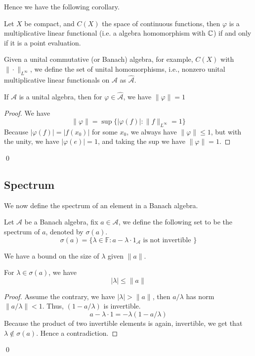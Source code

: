 Hence we have the following corollary.
\begin{corollary}
    Let $X$ be compact, and $C(X)$ the space of continuous functions, then $\varphi$ is a multiplicative linear functional (i.e. a algebra homomorphism with $\mathbb{C}$) if and only if it is a point evaluation.
\end{corollary}

\begin{definition}
    Given a unital commutative (or Banach) algebra, for example, $C(X)$ with $\|\cdot\|_{L^\infty}$, we define the set of unital homomorphisms, i.e., nonzero unital multiplicative linear functionals on $\mathcal{A}$ as $\widehat{\mathcal{A}}$.
\end{definition}
\begin{proposition}
    If $\mathcal{A}$ is a unital algebra, then for $\varphi\in\widehat{\mathcal{A}}$, we have $\|\varphi\|=1$
\end{proposition}
\begin{proof}
    We have
    \begin{equation*}
        \|\varphi\|=\sup\{|\varphi(f)|:\|f\|_{L^\infty}=1 \}
    \end{equation*}
    Because $|\varphi(f)|=|f(x_0)|$ for some $x_0$, we always have $\|\varphi\|\leq 1$, but with the unity, we have $|\varphi(e)|=1$, and taking the sup we have $\|\varphi\|=1$.
\end{proof}
\qed

\subsection{Spectrum}
We now define the spectrum of an element in a Banach algebra.
\begin{definition}[spectrum]
    Let $\mathcal{A}$ be a Banach algebra, fix $a\in\mathcal{A}$, we define the following set to be the spectrum of $a$, denoted by $\sigma(a)$.
    \begin{equation*}
        \sigma(a)=\{\lambda\in\mathbb{F}:a-\lambda\cdot 1_\mathcal{A} \text{ is not invertible } \}
    \end{equation*}
\end{definition}

We have a bound on the size of $\lambda$ given $\|a\|$.
\begin{proposition}
    For $\lambda\in\sigma(a)$, we have
    \begin{equation*}
        |\lambda|\leq\|a\|
    \end{equation*}
\end{proposition}
\begin{proof}
    Assume the contrary, we have $|\lambda|>\|a\|$, then $a/\lambda$ has norm $\|a/\lambda\|<1$. Thus, $(1-a/\lambda)$ is invertible.
    \begin{equation*}
        a-\lambda\cdot 1=-\lambda(1-a/\lambda)
    \end{equation*}
    Because the product of two invertible elements is again, invertible, we get that $\lambda\not\in\sigma(a)$. Hence a contradiction.
\end{proof}
\qed

